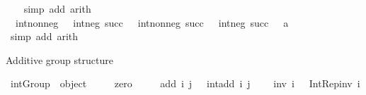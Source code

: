 \begin{isabellebody}
%
\isadelimproof
\ \ %
\endisadelimproof
%
\isatagproof
{}\isamarkupfalse%
\ {\isacharparenleft}{\kern0pt}simp\ add{\isacharcolon}{\kern0pt}\ arith{\isacharparenright}{\kern0pt}%
\endisatagproof
{\isafoldproof}%
%
\isadelimproof
\isanewline
%
\endisadelimproof
\isanewline
{}\isamarkupfalse%
\isanewline
\ \ {\isachardoublequoteopen}int{\isacharunderscore}{\kern0pt}nonneg\ {}\ {\isacharasterisk}{\kern0pt}\ int{\isacharunderscore}{\kern0pt}neg\ {\isacharparenleft}{\kern0pt}succ\ {}{\isacharparenright}{\kern0pt}\ {\isacharplus}{\kern0pt}\ int{\isacharunderscore}{\kern0pt}nonneg\ {\isacharparenleft}{\kern0pt}succ\ {}{\isacharparenright}{\kern0pt}\ {\isacharminus}{\kern0pt}\ int{\isacharunderscore}{\kern0pt}neg\ {\isacharparenleft}{\kern0pt}succ\ {}{\isacharparenright}{\kern0pt}\ {\isacharequal}{\kern0pt}\ {\isacharquery}{\kern0pt}a{\isachardoublequoteclose}\isanewline
%
\isadelimproof
\ \ %
\endisadelimproof
%
\isatagproof
{}\isamarkupfalse%
\ {\isacharparenleft}{\kern0pt}simp\ add{\isacharcolon}{\kern0pt}\ arith{\isacharparenright}{\kern0pt}%
\endisatagproof
{\isafoldproof}%
%
\isadelimproof
\isanewline
%
\endisadelimproof
\isanewline
{}\isamarkupfalse%
%
\isadelimdocument
%
\endisadelimdocument
%
\isatagdocument
%
\isamarkuptrue%
%
\endisatagdocument
{\isafolddocument}%
%
\isadelimdocument
%
\endisadelimdocument
%
\begin{isamarkuptext}%
Additive group structure%
\end{isamarkuptext}\isamarkuptrue%
\isamarkupfalse%
\ {\isachardoublequoteopen}int{\isacharunderscore}{\kern0pt}Group\ {\isasymequiv}\ object\ {\isacharbraceleft}{\kern0pt}\isanewline
\ \ \ \ {\isasymlangle}{\isacharat}{\kern0pt}zero{\isacharcomma}{\kern0pt}\ {}{\isasymrangle}{\isacharcomma}{\kern0pt}\isanewline
\ \ \ \ {\isasymlangle}{\isacharat}{\kern0pt}add{\isacharcomma}{\kern0pt}\ {\isasymlambda}i\ j\ {\isasymin}\ {\isasymint}{\isachardot}{\kern0pt}\ int{\isacharunderscore}{\kern0pt}add\ i\ j{\isasymrangle}{\isacharcomma}{\kern0pt}\isanewline
\ \ \ \ {\isasymlangle}{\isacharat}{\kern0pt}inv{\isacharcomma}{\kern0pt}\ {\isasymlambda}i\ {\isasymin}\ {\isasymint}{\isachardot}{\kern0pt}\ Int{\isacharunderscore}{\kern0pt}Rep{\isacharunderscore}{\kern0pt}inv\ i{\isasymrangle}\isanewline
\ \ {\isacharbraceright}{\kern0pt}{\isachardoublequoteclose}\isanewline
\isanewline
{}\isamarkupfalse%

\end{isabellebody}
